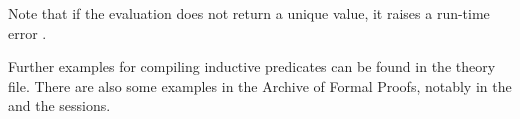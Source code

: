 \begin{isabellebody}
\begin{isamarkuptext}
\begin{itemize}
      \begin{quote}
      \end{quote}

      Note that if the evaluation does not return a unique value, it
      raises a run-time error .

  \end{itemize}%
\end{isamarkuptext}%
\isamarkuptrue%
%
\isamarkuptrue%
%
\begin{isamarkuptext}%
Further examples for compiling inductive predicates can be found in
  the  theory file.  There are
  also some examples in the Archive of Formal Proofs, notably in the
   and the 
  sessions.%
\end{isamarkuptext}%
\isamarkuptrue%
%
\isadelimtheory
%
\endisadelimtheory
%
\isatagtheory
{}\isamarkupfalse%
%
\endisatagtheory
{\isafoldtheory}%
%
\isadelimtheory
%
\endisadelimtheory
\isanewline
\end{isabellebody}%
